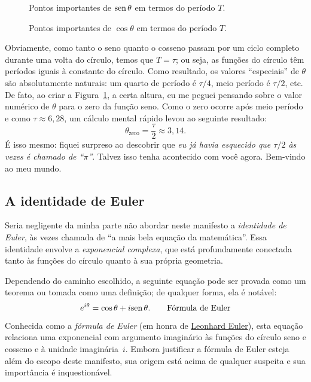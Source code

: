 \begin{figure}
\begin{center}
\end{center}
\caption{Pontos importantes de $\mbox{sen}\,\theta$ em termos do período $T$.\label{fig:sine_with_tau}}
\end{figure}

\begin{figure}
\begin{center}
\end{center}
\caption{Pontos importantes de $\cos\theta$ em termos do período $T$.\label{fig:cosine_with_tau}}
\end{figure}

Obviamente, como tanto o seno quanto o cosseno passam por um ciclo completo durante uma volta do círculo, temos que $T = \tau$; ou seja, as funções do círculo têm períodos iguais à constante do círculo. Como resultado, os valores ``especiais'' de $\theta$ são absolutamente naturais: um quarto de período é $\tau/4$, meio período é $\tau/2$, etc. De fato, ao criar a Figura~\ref{fig:sine_with_tau}, a certa altura, eu me peguei pensando sobre o valor numérico de $\theta$ para o zero da função seno. Como o zero ocorre após meio período e como $\tau \approx 6,28$, um cálculo mental rápido levou ao seguinte resultado:
\[
  \theta_\mathrm{zero} = \frac{\tau}{2} \approx 3,14.
\]
É isso mesmo: fiquei surpreso ao descobrir que \emph{eu já havia esquecido que $\tau/2$ às vezes é chamado de ``$\pi$''}. Talvez isso tenha acontecido com você agora. Bem-vindo ao meu mundo.



   \subsection{A identidade de Euler} %
   \label{sec:euler_s_identity}

Seria negligente da minha parte não abordar neste manifesto a \emph{identidade de Euler}, às vezes chamada de ``a mais bela equação da matemática''. Essa identidade envolve a \emph{exponencial complexa}, que está profundamente conectada tanto às funções do círculo quanto à sua própria geometria.

Dependendo do caminho escolhido, a seguinte equação pode ser provada como um teorema ou tomada como uma definição; de qualquer forma, ela é notável:
\begin{equation}
\label{eq:eulers_formula}
e^{i\theta} = \cos\theta + i\mbox{sen}\,\theta. \qquad\mbox{Fórmula de Euler}
\end{equation}
Conhecida como a \emph{fórmula de Euler} (em honra de \href{https://pt.wikipedia.org/wiki/Leonhard_Euler}{Leonhard Euler}), esta equação relaciona uma exponencial com argumento imaginário às funções do círculo seno e cosseno e à unidade imaginária~$i$. Embora justificar a fórmula de Euler esteja além do escopo deste manifesto, sua origem está acima de qualquer suspeita e sua importância é inquestionável.

